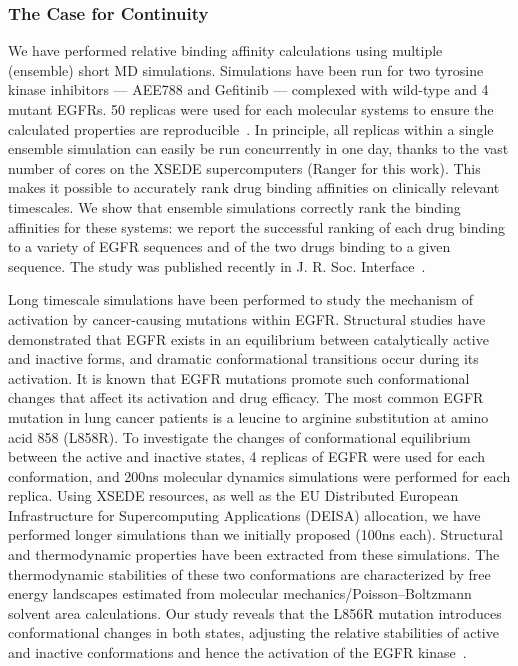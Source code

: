\documentclass[a4paper,10pt]{article}
\begin{document}
\subsubsection{The Case for Continuity}
We have performed relative binding affinity calculations using multiple (ensemble) short MD 
simulations. Simulations have been run for two tyrosine kinase inhibitors — AEE788 and Gefitinib — 
complexed with wild-type and 4 mutant EGFRs. 50 replicas were used for each molecular systems to 
ensure the calculated properties are reproducible~\cite{Ref6}. In principle, all replicas within a single 
ensemble simulation can easily be run concurrently in one day, thanks to the vast number of cores 
on the XSEDE supercomputers (Ranger for this work). This makes it possible to accurately rank 
drug binding affinities on clinically relevant timescales. We show that ensemble simulations 
correctly rank the binding affinities for these systems: we report the successful ranking of each 
drug binding to a variety of EGFR sequences and of the two drugs binding to a given sequence. The 
study was published recently in J. R. Soc. Interface~\cite{Ref6}.

Long timescale simulations have been performed to study the mechanism of activation by 
cancer-causing mutations within EGFR. Structural studies have demonstrated that EGFR exists in an 
equilibrium between catalytically active and inactive forms, and dramatic conformational 
transitions occur during its activation. It is known that EGFR mutations promote such conformational 
changes that affect its activation and drug efficacy. The most common EGFR mutation in lung cancer 
patients is a leucine to arginine substitution at amino acid 858 (L858R). To investigate the changes 
of conformational equilibrium between the active and inactive states, 4 replicas of EGFR were used 
for each conformation, and 200ns molecular dynamics simulations were performed for each replica. 
Using XSEDE resources, as well as the EU Distributed European Infrastructure for Supercomputing 
Applications (DEISA) allocation, we have performed longer simulations than we initially proposed 
(100ns each). Structural and thermodynamic properties have been extracted from these simulations. 
The thermodynamic stabilities of these two conformations are characterized by free energy landscapes 
estimated from molecular mechanics/Poisson–Boltzmann solvent area calculations. Our study reveals 
that the L856R mutation introduces conformational changes in both states, adjusting the relative 
stabilities of active and inactive conformations and hence the activation of the EGFR kinase~\cite{Ref7}.
\end{document}
